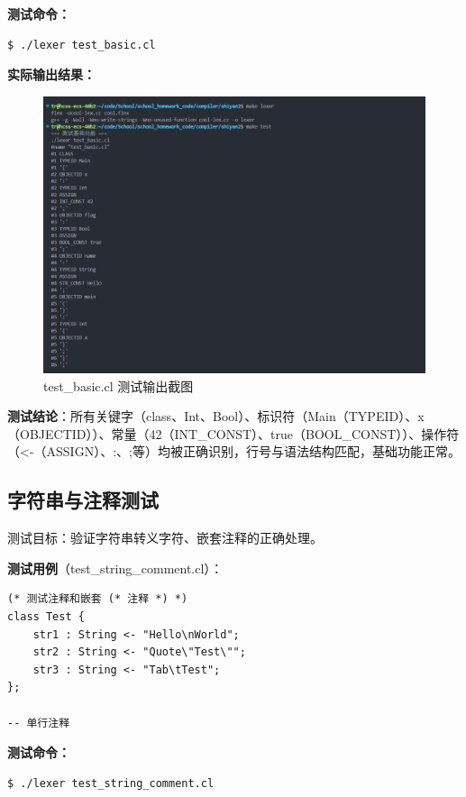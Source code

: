 \documentclass[twocolumn]{article}
\begin{document}
\textbf{测试命令：}
\begin{verbatim}
$ ./lexer test_basic.cl
\end{verbatim}

\textbf{实际输出结果：}
\begin{figure}[H]
    \centering
    \includegraphics[width=0.95\linewidth]{test_basic_output.png}  %
    \caption{test_basic.cl 测试输出截图}  %
\end{figure}

\textbf{测试结论}：所有关键字（class、Int、Bool）、标识符（Main（TYPEID）、x（OBJECTID））、常量（42（INT_CONST）、true（BOOL_CONST））、操作符（<-（ASSIGN）、:、;等）均被正确识别，行号与语法结构匹配，基础功能正常。

\subsection{字符串与注释测试}

测试目标：验证字符串转义字符、嵌套注释的正确处理。

\textbf{测试用例}（test\_string_comment.cl）：
\begin{lstlisting}[language=cool, caption={字符串与注释测试}]
(* 测试注释和嵌套 (* 注释 *) *)
class Test {
    str1 : String <- "Hello\nWorld";
    str2 : String <- "Quote\"Test\"";
    str3 : String <- "Tab\tTest";
};

-- 单行注释
\end{lstlisting}

\textbf{测试命令：}
\begin{verbatim}
$ ./lexer test_string_comment.cl
\end{verbatim}
\end{document}
